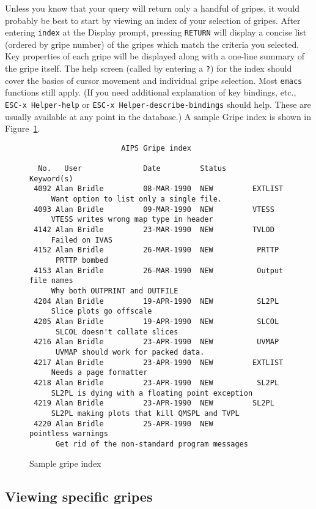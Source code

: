 Unless you know that your query will return only a handful of gripes,
it would probably be best to start by viewing an index of your
selection of gripes. After entering {\tt index} at the Display prompt,
pressing {\tt RETURN} will display a concise list (ordered by gripe
number) of the gripes which match the criteria you selected.  Key
properties of each gripe will be displayed along with a one-line
summary of the gripe itself. The help screen (called by entering a
{\tt ?}) for the index should cover the basics of cursor movement and
individual gripe selection. Most {\tt emacs} functions still apply.
(If you need additional explanation of key bindings, etc., {\tt ESC-x
Helper-help} or {\tt ESC-x Helper-describe-bindings} should help.
These are usually available at any point in the database.)  A sample
Gripe index is shown in Figure~\ref{fig:index}.
\begin{figure}
\begin{center}
\begin{verbatim}
                     AIPS Gripe index

  No.   User              Date         Status      Keyword(s)
 4092 Alan Bridle         08-MAR-1990  NEW         EXTLIST
     Want option to list only a single file.
 4093 Alan Bridle         09-MAR-1990  NEW         VTESS
     VTESS writes wrong map type in header
 4142 Alan Bridle         23-MAR-1990  NEW         TVLOD
     Failed on IVAS
 4152 Alan Bridle         26-MAR-1990  NEW          PRTTP
      PRTTP bombed
 4153 Alan Bridle         26-MAR-1990  NEW          Output file names
     Why both OUTPRINT and OUTFILE
 4204 Alan Bridle         19-APR-1990  NEW          SL2PL
     Slice plots go offscale
 4205 Alan Bridle         19-APR-1990  NEW          SLCOL
      SLCOL doesn't collate slices
 4216 Alan Bridle         23-APR-1990  NEW          UVMAP
      UVMAP should work for packed data.
 4217 Alan Bridle         23-APR-1990  NEW         EXTLIST
     Needs a page formatter
 4218 Alan Bridle         23-APR-1990  NEW          SL2PL
     SL2PL is dying with a floating point exception
 4219 Alan Bridle         23-APR-1990  NEW         SL2PL
     SL2PL making plots that kill QMSPL and TVPL
 4220 Alan Bridle         25-APR-1990  NEW         pointless warnings
      Get rid of the non-standard program messages
\end{verbatim}
\end{center}
\caption{Sample gripe index}
\label{fig:index}
\end{figure}

\subsection{Viewing specific gripes}

